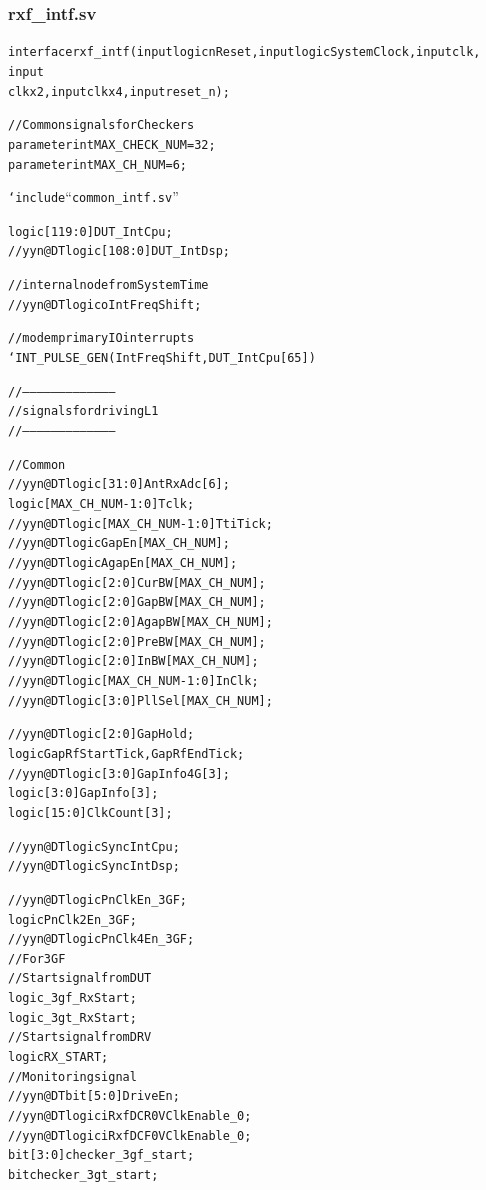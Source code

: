 \documentclass{note}
\begin{document}
\subsubsection{rxf\_intf.sv}
\begin{alltt}
interface rxf_intf(input logic nReset, input logic SystemClock, input clk,
input
 clkx2, input clkx4, input reset_n);

   // Common signals for Checkers
   parameter int MAX_CHECK_NUM = 32;
   parameter int MAX_CH_NUM = 6;

   `include ``common_intf.sv''

   logic   [119:0]       DUT_IntCpu;
   // yyn@DT logic   [108:0]       DUT_IntDsp;

   // internal node from SystemTime
   // yyn@DT logic oIntFreqShift;

   // modem primary IO interrupts
   `INT_PULSE_GEN (IntFreqShift,DUT_IntCpu[65])

   // ---------------------------------------
   // signals for driving L1
   // ---------------------------------------

   // Common
   // yyn@DT logic [31:0]            AntRxAdc[6];
   logic [MAX_CH_NUM-1:0]  Tclk;
   // yyn@DT logic [MAX_CH_NUM-1:0]  TtiTick;
   // yyn@DT logic                   GapEn   [MAX_CH_NUM];
   // yyn@DT logic                   AgapEn  [MAX_CH_NUM];
   // yyn@DT logic [2:0]             CurBW   [MAX_CH_NUM];
   // yyn@DT logic [2:0]             GapBW   [MAX_CH_NUM];
   // yyn@DT logic [2:0]             AgapBW  [MAX_CH_NUM];
   // yyn@DT logic [2:0]             PreBW   [MAX_CH_NUM];
   // yyn@DT logic [2:0]             InBW    [MAX_CH_NUM];
   // yyn@DT logic [MAX_CH_NUM-1:0]  InClk;
   // yyn@DT logic   [3:0]           PllSel  [MAX_CH_NUM];

   // yyn@DT logic   [2:0]           GapHold;
   logic                  GapRfStartTick, GapRfEndTick;
   // yyn@DT logic   [3:0]          GapInfo4G[3];
   logic   [3:0]          GapInfo[3];
   logic   [15:0]         ClkCount[3];

   // yyn@DT logic                  SyncIntCpu;
   // yyn@DT logic                  SyncIntDsp;

   // yyn@DT logic                   PnClkEn_3GF;
   logic                   PnClk2En_3GF;
   // yyn@DT logic                   PnClk4En_3GF;
   // For 3GF
   // Start signal from DUT
   logic                   _3gf_RxStart;
   logic                   _3gt_RxStart;
   // Start signal from DRV
   logic                   RX_START;
   // Monitoring signal
   // yyn@DT bit   [5:0]             DriveEn;
   // yyn@DT logic                   iRxfDCR0VClkEnable_0;
   // yyn@DT logic                   iRxfDCF0VClkEnable_0;
   bit [3:0] checker_3gf_start;
   bit checker_3gt_start;


\end{alltt}
\end{document}
